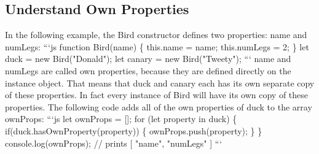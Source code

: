 \documentclass{article}%
\begin{document}
\subsection{Understand Own Properties}%
\label{subsec:UnderstandOwnProperties}%
In the following example, the Bird constructor defines two properties: name and numLegs:\newline%
```js\newline%
function Bird(name) \{\newline%
  this.name  = name;\newline%
  this.numLegs = 2;\newline%
\}\newline%
let duck = new Bird("Donald");\newline%
let canary = new Bird("Tweety");\newline%
```\newline%
name and numLegs are called own properties, because they are defined directly on the instance object. That means that duck and canary each has its own separate copy of these properties.\newline%
In fact every instance of Bird will have its own copy of these properties.\newline%
The following code adds all of the own properties of duck to the array ownProps:\newline%
```js\newline%
let ownProps = {[}{]};\newline%
for (let property in duck) \{\newline%
  if(duck.hasOwnProperty(property)) \{\newline%
    ownProps.push(property);\newline%
  \}\newline%
\}\newline%
console.log(ownProps); // prints {[} "name", "numLegs" {]}\newline%
```\newline%

%
\end{document}
